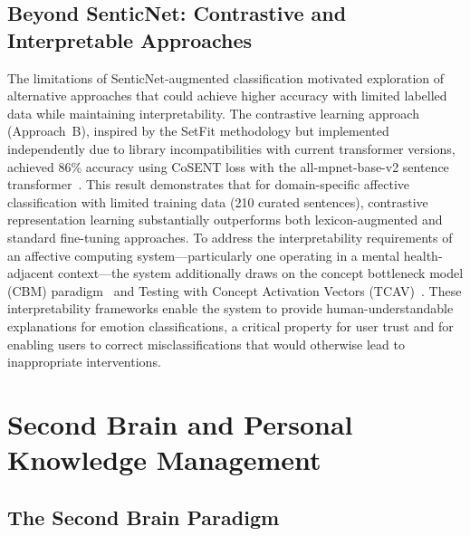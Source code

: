 \subsection{Beyond SenticNet: Contrastive and Interpretable Approaches}
\label{sec:litrev_beyond_senticnet}

The limitations of SenticNet-augmented classification motivated exploration of alternative approaches that could achieve higher accuracy with limited labelled data while maintaining interpretability. The contrastive learning approach (Approach~B), inspired by the SetFit methodology but implemented independently due to library incompatibilities with current transformer versions, achieved 86\% accuracy using CoSENT loss with the all-mpnet-base-v2 sentence transformer~\cite{reimers2019}. This result demonstrates that for domain-specific affective classification with limited training data (210 curated sentences), contrastive representation learning substantially outperforms both lexicon-augmented and standard fine-tuning approaches. To address the interpretability requirements of an affective computing system---particularly one operating in a mental health-adjacent context---the system additionally draws on the concept bottleneck model (CBM) paradigm~\cite{koh2020, yuksekgonul2023} and Testing with Concept Activation Vectors (TCAV)~\cite{kim2018}. These interpretability frameworks enable the system to provide human-understandable explanations for emotion classifications, a critical property for user trust and for enabling users to correct misclassifications that would otherwise lead to inappropriate interventions.

\section{Second Brain and Personal Knowledge Management}
\label{sec:litrev_second_brain}

\subsection{The Second Brain Paradigm}
\label{sec:litrev_second_brain_paradigm}

